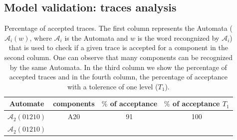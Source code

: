 \subsection{Model validation: traces analysis}

\begin{table}[!t]
\renewcommand{\arraystretch}{1.3}

\caption{Percentage of accepted traces. The first column represents the Automata ($\mathcal{A}_{i}(w)$, where $\mathcal{A}_{i}$ is the Automata and $w$ is the word recongnized by $\mathcal{A}_{i}$) 
that is used to check if a given trace is accepted for a component in the second 
column. One can observe that many components can be recognized by the same Automata. In the third column we show the percentage of accepted traces 
and in the fourth column, the percentage of acceptance with a tolerence of one level ($T_{1}$).}

\label{traceAnalysis}
\centering
\begin{tabular}{|c|c||c|c|}
\hline

\textbf{Automate}

&

\textbf{components}

&

\textbf{$\%$ of acceptance}

&

\textbf{$\%$ of acceptance $T_{1}$}
\\ \hline

$\mathcal{A}_{2}(01210)$

&

A20

&

91

&

100
\\ \hline

$\mathcal{A}_{2}(01210)$


\end{tabular}
\end{table}
